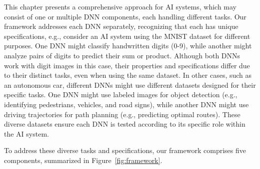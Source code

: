 

This chapter presents a comprehensive approach for AI systems, which may consist of one or multiple DNN components, each handling different tasks. Our framework addresses each DNN separately, recognizing that each has unique specifications, e.g., consider an AI system using the MNIST dataset for different purposes. One DNN might classify handwritten digits (0-9), while another might analyze pairs of digits to predict their sum or product. Although both DNNs work with digit images in this case, their properties and specifications differ due to their distinct tasks, even when using the same dataset. In other cases, such as an autonomous car, different DNNs might use different datasets designed for their specific tasks. One DNN might use labeled images for object detection (e.g., identifying pedestrians, vehicles, and road signs), while another DNN might use driving trajectories for path planning (e.g., predicting optimal routes). These diverse datasets ensure each DNN is tested according to its specific role within the AI system.

To address these diverse tasks and specifications, our framework comprises five components, summarized in Figure~\ref{fig:framework}.



